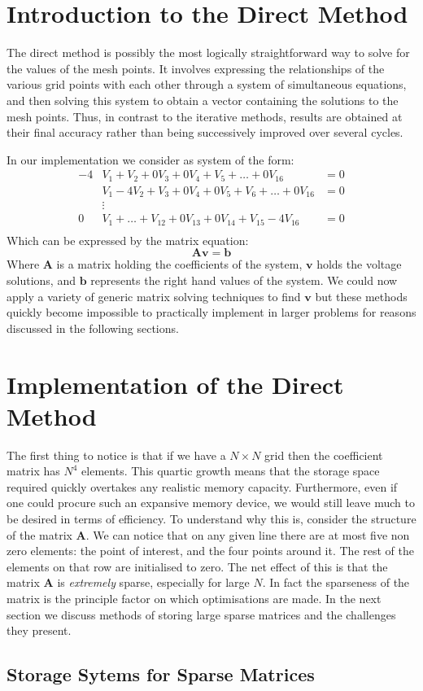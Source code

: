 \documentclass[a4paper]{article}
\newcommand{\mat}[1]{\mathbf{#1}}
\renewcommand{\vec}[1]{\bm{#1}}
\begin{document}
%

\section{Introduction to the Direct Method}
The direct method is possibly the most logically straightforward way to solve
for the values of the mesh points. It involves expressing the relationships of
the various grid points with each other through a system of simultaneous
equations, and then solving this system to obtain a vector containing the
solutions to the mesh points. Thus, in contrast to the iterative methods,
results are obtained at their final accuracy rather than being successively
improved over several cycles.

In our implementation we consider as system of the form:
\begin{align*}
	-4&V_1+V_2+0V_3+0V_4+V_5+\dots+0V_{16}&=0\\
	&V_1-4V_2+V_3+0V_4+0V_5+V_6+\dots+0V_{16}&=0\\
	&\vdots\\
	0&V_1+\dots+V_{12}+0V_{13}+0V_{14}+V_{15}-4V_{16}&=0\\
\end{align*}
Which can be expressed by the matrix equation:
\begin{equation*}
	\mat{A}\vec{v}=\vec{b}
\end{equation*}
Where $\mat{A}$ is a matrix holding the coefficients of the system, $\vec{v}$
holds the voltage solutions, and $\vec{b}$ represents the right hand values of
the system. We could now apply a variety of generic matrix solving techniques
to find $\vec{v}$ but these methods quickly become impossible to practically
implement in larger problems for reasons discussed in the following sections.

\section{Implementation of the Direct Method}
The first thing to notice is that if we have a $N\times N$ grid then the
coefficient matrix has $N^4$ elements. This quartic growth means that the
storage space required quickly overtakes any realistic memory capacity.
Furthermore, even if one could procure such an expansive memory device, we
would still leave much to be desired in terms of efficiency. To understand why
this is, consider the structure of the matrix $\mat{A}$. We can notice that on
any given line there are at most five non zero elements: the point of interest,
and the four points around it. The rest of the elements on that row are
initialised to zero. The net effect of this is that the matrix $\mat{A}$ is
\emph{extremely} sparse, especially for large $N$. In fact the sparseness of
the matrix is the principle factor on which optimisations are made. In the next
section we discuss methods of storing large sparse matrices and the challenges
they present.

\subsection{Storage Sytems for Sparse Matrices}
\end{document}
